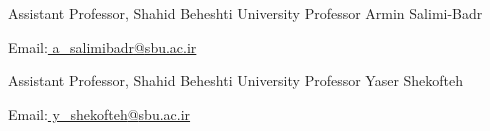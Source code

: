 \begin{cventries}
    \cventry
    {Assistant Professor, Shahid Beheshti University}
    {Professor Armin Salimi-Badr}
    {}
    {}
    {
      \begin{cvitems}
	    \item{Email:\href{mailto:a_salimibadr@sbu.ac.ir}{ a\_salimibadr{@}sbu.ac.ir}}
      \end{cvitems}
    }
    \vspace{0.6 cm}
    \cventry
    {Assistant Professor, Shahid Beheshti University}
    {Professor Yaser Shekofteh}
    {}
    {}
    {
      \begin{cvitems}
	    \item{Email:\href{mailto:y_shekofteh@sbu.ac.ir}{ y\_shekofteh{@}sbu.ac.ir}}
      \end{cvitems}
    }
\end{cventries}

